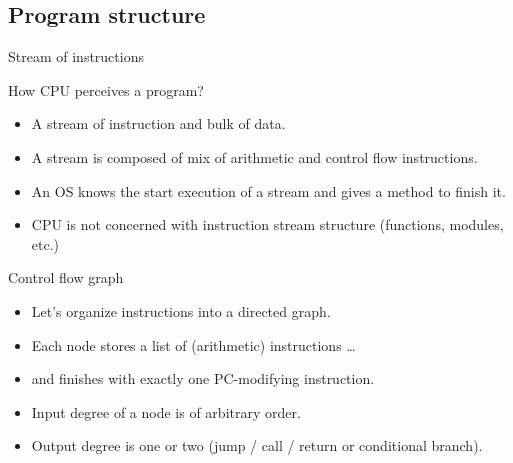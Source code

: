 \documentclass[8pt]{beamer}
\begin{document}
\subsection*{Program structure}

\begin{frame}{Stream of instructions}
  \begin{block}{How CPU perceives a program?}
    \begin{itemize}
      \item A stream of instruction and bulk of data.
      \item A stream is composed of mix of arithmetic and control flow instructions.
      \item An OS knows the start execution of a stream and gives a method to
        finish it.
      \item CPU is not concerned with instruction stream structure (functions,
        modules, etc.)
    \end{itemize}
  \end{block}

  \begin{block}{Control flow graph}
    \begin{itemize}
      \item Let's organize instructions into a directed graph.
      \item Each node stores a list of (arithmetic) instructions \ldots
      \item and finishes with exactly one PC-modifying instruction.
      \item Input degree of a node is of arbitrary order.
      \item Output degree is one or two (jump / call / return or conditional branch).
    \end{itemize}
  \end{block}
\end{frame}
\end{document}
